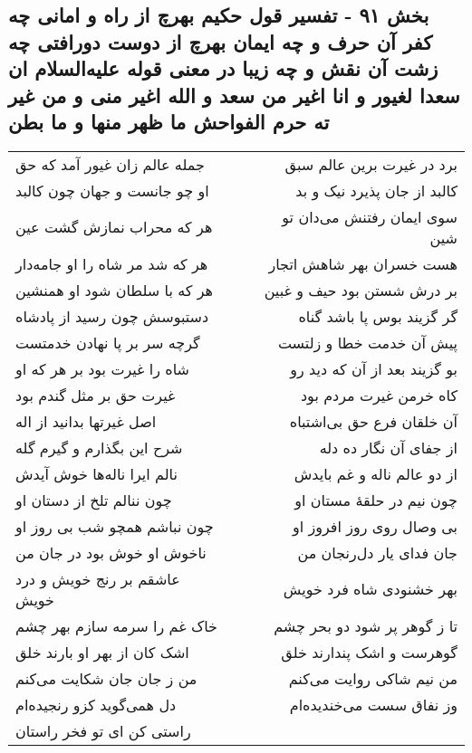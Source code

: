 \begin{center}
\section*{بخش ۹۱ - تفسیر قول حکیم بهرچ از راه و امانی چه کفر آن حرف و چه ایمان بهرچ از دوست دورافتی چه زشت آن نقش و چه زیبا در معنی قوله علیه‌السلام ان سعدا لغیور و انا اغیر من سعد و الله اغیر منی و من غیر ته حرم الفواحش ما ظهر منها و ما بطن}
\label{sec:sh091}
\begin{longtable}{l p{0.5cm} r}
جمله عالم زان غیور آمد که حق
&&
برد در غیرت برین عالم سبق
\\
او چو جانست و جهان چون کالبد
&&
کالبد از جان پذیرد نیک و بد
\\
هر که محراب نمازش گشت عین
&&
سوی ایمان رفتنش می‌دان تو شین
\\
هر که شد مر شاه را او جامه‌دار
&&
هست خسران بهر شاهش اتجار
\\
هر که با سلطان شود او همنشین
&&
بر درش شستن بود حیف و غبین
\\
دستبوسش چون رسید از پادشاه
&&
گر گزیند بوس پا باشد گناه
\\
گرچه سر بر پا نهادن خدمتست
&&
پیش آن خدمت خطا و زلتست
\\
شاه را غیرت بود بر هر که او
&&
بو گزیند بعد از آن که دید رو
\\
غیرت حق بر مثل گندم بود
&&
کاه خرمن غیرت مردم بود
\\
اصل غیرتها بدانید از اله
&&
آن خلقان فرع حق بی‌اشتباه
\\
شرح این بگذارم و گیرم گله
&&
از جفای آن نگار ده دله
\\
نالم ایرا ناله‌ها خوش آیدش
&&
از دو عالم ناله و غم بایدش
\\
چون ننالم تلخ از دستان او
&&
چون نیم در حلقهٔ مستان او
\\
چون نباشم همچو شب بی روز او
&&
بی وصال روی روز افروز او
\\
ناخوش او خوش بود در جان من
&&
جان فدای یار دل‌رنجان من
\\
عاشقم بر رنج خویش و درد خویش
&&
بهر خشنودی شاه فرد خویش
\\
خاک غم را سرمه سازم بهر چشم
&&
تا ز گوهر پر شود دو بحر چشم
\\
اشک کان از بهر او بارند خلق
&&
گوهرست و اشک پندارند خلق
\\
من ز جان جان شکایت می‌کنم
&&
من نیم شاکی روایت می‌کنم
\\
دل همی‌گوید کزو رنجیده‌ام
&&
وز نفاق سست می‌خندیده‌ام
\\
راستی کن ای تو فخر راستان

\end{longtable}
\end{center}
